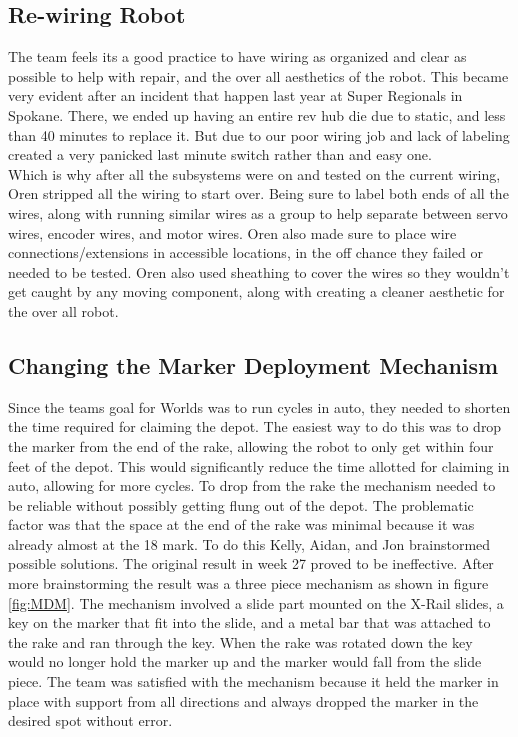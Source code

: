 \documentclass{article}
\begin{document}
\subsection{Re-wiring Robot}
The team feels its a good practice to have wiring as organized and clear as possible to help with repair, and the over all aesthetics of the robot. This became very evident after an incident that happen last year at Super Regionals in Spokane. There, we ended up having an entire rev hub die due to static, and less than 40 minutes to replace it. But due to our poor wiring job and lack of labeling created a very panicked last minute switch rather than and easy one. \\

Which is why after all the subsystems were on and tested on the current wiring, Oren stripped all the wiring to start over. Being sure to label both ends of all the wires, along with running similar wires as a group to help separate between servo wires, encoder wires, and motor wires. Oren also made sure to place wire connections/extensions in accessible locations, in the off chance they failed or needed to be tested. Oren also used sheathing to cover the wires so they wouldn't get caught by any moving component, along with creating a cleaner aesthetic for the over all robot. 

\subsection{Changing the Marker Deployment Mechanism}
Since the teams goal for Worlds was to run cycles in auto, they needed to shorten the time required for claiming the depot. The easiest way to do this was to drop the marker from the end of the rake, allowing the robot to only get within four feet of the depot. This would significantly reduce the time allotted for claiming in auto, allowing for more cycles. To drop from the rake the mechanism needed to be reliable without possibly getting flung out of the depot. The problematic factor was that the space at the end of the rake was minimal because it was already almost at the 18 mark. To do this Kelly, Aidan, and Jon brainstormed possible solutions. The original result in week 27 proved to be ineffective. After more brainstorming the result was a three piece mechanism as shown in figure \ref{fig:MDM}. The mechanism involved a slide part mounted on the X-Rail slides, a key on the marker that fit into the slide, and a metal bar that was attached to the rake and ran through the key. When the rake was rotated down the key would no longer hold the marker up and the marker would fall from the slide piece. The team was satisfied with the mechanism because it held the marker in place with support from all directions and always dropped the marker in the desired spot without error.
\end{document}
